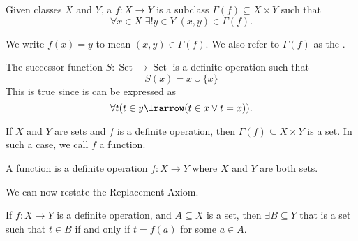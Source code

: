\documentclass[notoc,notitlepage]{tufte-book}
\DeclareMathOperator{\Set}{Set }
\begin{document}
\begin{defn}
\label{defn:definite_operation}
  Given classes $X$ and $Y$, a  $f: X \to Y$ is a subclass $\Gamma(f) \subseteq X \times Y$ such that
  \begin{equation*}
    \forall x \in X \; \exists ! y \in Y \; (x, y) \in \Gamma(f).
  \end{equation*}
\end{defn}

\begin{note}
  We write $f(x) = y$ to mean $(x, y) \in \Gamma(f)$. We also refer to $\Gamma(f)$ as the .
\end{note}

\begin{eg}
  The successor function $S : \Set \to \Set$ is a definite operation such that
  \begin{equation*}
    S(x) = x \cup \{x\}
  \end{equation*}
  This is true since is can be expressed as
  \begin{equation*}
    \forall t ( t \in y \lrarrow ( t \in x \lor t = x ) ).
  \end{equation*}
\end{eg}

\begin{note}
  If $X$ and $Y$ are sets and $f$ is a definite operation, then $\Gamma(f) \subseteq X \times Y$ is a set. In such a case, we call $f$ a function.
\end{note}

\begin{defn}[Functions]
\label{defn:functions}
  A function is a definite operation $f : X \to Y$ where $X$ and $Y$ are both sets.
\end{defn}

We can now restate the Replacement Axiom.

\begin{axiom}
\label{axiom:replacement_axiom_restated}
  If $f : X \to Y$ is a definite operation, and $A \subseteq X$ is a set, then $\exists B \subseteq Y$ that is a set such that $t \in B$ if and only if $t = f(a)$ for some $a \in A$.
\end{axiom}

\end{document}
